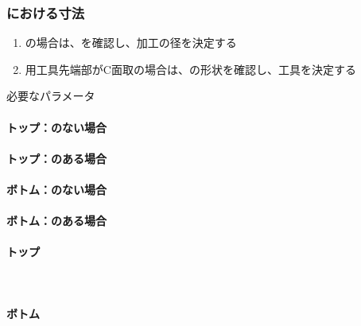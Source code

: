 \subsubsection{\EndFaceChamfer における寸法}
\begin{enumerate}[label=\sarrow]
\item \EndFaceOutCChamfer の場合は、\OutcutExists を確認し、加工の径を決定する
\item {}\nameOutcut 用工具先端部がC面取の場合は、\nameOutcut の形状を確認し、工具を決定する
\end{enumerate}
\begin{Parameter}{必要なパラメータ}
\paragraph*{トップ\EndFaceOutCChamfer：\Outcut のない場合}
\PMACOD
\PMBDOD
\PMTopEndFaceOutCChamferLength
\PMODCornerR
\tcbline*
\paragraph*{トップ\EndFaceOutCChamfer：\Outcut のある場合}
\PMTopOutcutAC
\PMTopOutcutBD
\PMTopOutcutCornerR
\PMTopEndFaceOutCChamferLength
\tcbline*
\paragraph*{ボトム\EndFaceOutCChamfer：\Outcut のない場合}
\PMACOD
\PMBDOD
\PMBottomEndFaceOutCChamferLength
\PMODCornerR
\tcbline*
\paragraph*{ボトム\EndFaceOutCChamfer：\Outcut のある場合}
\PMBottomOutcutAC
\PMBottomOutcutBD
\PMBottomOutcutConerR
\PMBottomEndFaceOutCChamferLength
\tcbline*
\paragraph*{トップ\EndFaceInCChamfer}
\PMTopEndACID
\PMTopEndBDID
\PMTopEndIDCornerR\\
\PMTopEndFaceInCChamferLength
\PMPlatingThk
\tcbline*
\paragraph*{ボトム\EndFaceInCChamfer}
\PMBottomEndACID
\PMBottomEndBDID
\PMBottomEndIDCornerR\\
\PMBottomEndFaceInCChamferLength
\PMPlatingThk
\end{Parameter}

